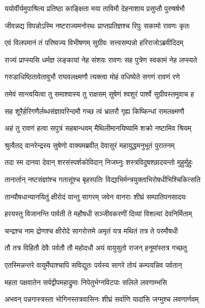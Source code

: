 \twolineshloka
{ययोर्वीर्यमुपाश्रित्य प्रतिष्ठा काङ्क्षिता मया}
{ताविमौ देहनाशाय प्रसुप्तौ पुरुषर्षभौ} %

\twolineshloka
{जीवन्नद्य विपन्नोऽस्मि नष्टराज्यमनोरथः}
{प्राप्तप्रतिज्ञश्च रिपुः सकामो रावणः कृतः} %

\twolineshloka
{एवं विलपमानं तं परिष्वज्य विभीषणम्}
{सुग्रीवः सत्त्वसम्पन्नो हरिराजोऽब्रवीदिदम्} %

\twolineshloka
{राज्यं प्राप्स्यसि धर्मज्ञ लङ्कायां नेह संशयः}
{रावणः सह पुत्रेण स्वकामं नेह लप्स्यते} %

\twolineshloka
{गरुडाधिष्ठितावेतावुभौ राघवलक्ष्मणौ}
{त्यक्त्वा मोहं वधिष्येते सगणं रावणं रणे} %

\twolineshloka
{तमेवं सान्त्वयित्वा तु समाश्वास्य तु राक्षसम्}
{सुषेणं श्वशुरं पार्श्वे सुग्रीवस्तमुवाच ह} %

\twolineshloka
{सह शूरैर्हरिगणैर्लब्धसंज्ञावरिन्दमौ}
{गच्छ त्वं भ्रातरौ गृह्य किष्किन्धां रामलक्ष्मणौ} %

\twolineshloka
{अहं तु रावणं हत्वा सपुत्रं सहबान्धवम्}
{मैथिलीमानयिष्यामि शक्रो नष्टामिव श्रियम्} %

\twolineshloka
{श्रुत्वैतद् वानरेन्द्रस्य सुषेणो वाक्यमब्रवीत्}
{देवासुरं महायुद्धमनुभूतं पुरातनम्} %

\twolineshloka
{तदा स्म दानवा देवान् शरसंस्पर्शकोविदान्}
{निजघ्नुः शस्त्रविदुषश्छादयन्तो मुहुर्मुहुः} %

\twolineshloka
{तानार्तान् नष्टसंज्ञांश्च गतासूंश्च बृहस्पतिः}
{विद्याभिर्मन्त्रयुक्ताभिरोषधीभिश्चिकित्सति} %

\twolineshloka
{तान्यौषधान्यानयितुं क्षीरोदं यान्तु सागरम्}
{जवेन वानराः शीघ्रं सम्पातिपनसादयः} %

\twolineshloka
{हरयस्तु विजानन्ति पार्वती ते महौषधी}
{सञ्जीवकरणीं दिव्यां विशल्यां देवनिर्मिताम्} %

\twolineshloka
{चन्द्रश्च नाम द्रोणश्च क्षीरोदे सागरोत्तमे}
{अमृतं यत्र मथितं तत्र ते परमौषधी} %

\twolineshloka
{तौ तत्र विहितौ देवैः पर्वतौ तौ महोदधौ}
{अयं वायुसुतो राजन् हनूमांस्तत्र गच्छतु} %

\twolineshloka
{एतस्मिन्नन्तरे वायुर्मेघाश्चापि सविद्युतः}
{पर्यस्य सागरे तोयं कम्पयन्निव पर्वतान्} %

\twolineshloka
{महता पक्षवातेन सर्वद्वीपमहाद्रुमाः}
{निपेतुर्भग्नविटपाः सलिले लवणाम्भसि} %

\twolineshloka
{अभवन् पन्नगास्त्रस्ता भोगिनस्तत्रवासिनः}
{शीघ्रं सर्वाणि यादांसि जग्मुश्च लवणार्णवम्} %

